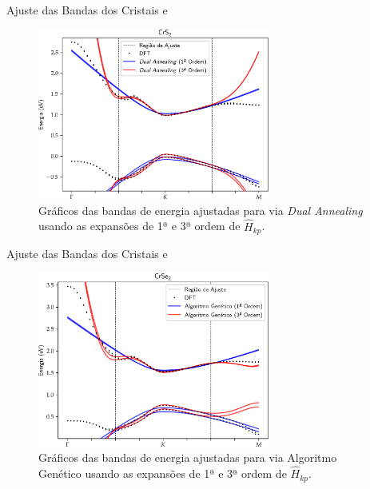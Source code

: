 \begin{frame}{Ajuste das Bandas dos Cristais  e }
  \begin{figure}
    \centering
    \includegraphics[width=0.68\textwidth]{imagens/crs2_dual_annealing_order_13.png}
    \caption{
      Gráficos das bandas de energia ajustadas para  via \textit{Dual Annealing}
      usando as expansões de 1ª e 3ª ordem de $ \hat{H}_{kp} $.
    }
  \end{figure}
\end{frame}

\begin{frame}{Ajuste das Bandas dos Cristais  e }
  \begin{figure}
    \centering
    \includegraphics[width=0.68\textwidth]{imagens/crse2_genetic_algorithm_order_13.png}
    \caption{
      Gráficos das bandas de energia ajustadas para  via Algoritmo Genético
      usando as expansões de 1ª e 3ª ordem de $ \hat{H}_{kp} $.
    }
  \end{figure}
\end{frame}

